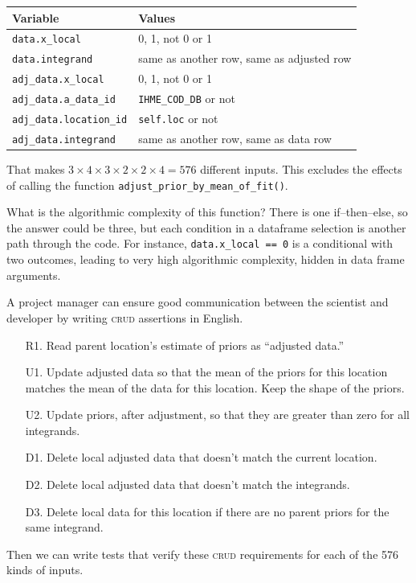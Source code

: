 \documentclass[fleqn,10pt]{olplainarticle}
\begin{document}
\begin{center}
\begin{tabular}{|l|l|}
\hline Variable & Values \\ \hline
\lstinline!data.x_local! & 0, 1, not 0 or 1 \\
\lstinline!data.integrand! & same as another row, same as adjusted row \\
\lstinline!adj_data.x_local! & 0, 1, not 0 or 1 \\
\lstinline!adj_data.a_data_id! & \lstinline!IHME_COD_DB! or not \\
\lstinline!adj_data.location_id! & \lstinline!self.loc! or not \\
\lstinline!adj_data.integrand! & same as another row, same as data row \\ \hline
\end{tabular}
\end{center}

\noindent{}That makes $3\times 4 \times 3\times 2\times 2\times 4=576$ different inputs.
This excludes the effects of calling the function
\lstinline!adjust_prior_by_mean_of_fit()!.

What is the algorithmic complexity of this function? There is one
if--then--else, so the answer could be three, but each condition in a dataframe
selection is another path through the code. For instance,
\lstinline!data.x_local == 0! is a conditional with two outcomes, leading
to very high algorithmic complexity, hidden in data frame arguments.

A project manager can ensure good communication between the scientist and
developer by writing \textsc{crud} assertions in English.
\begin{itemize}
    \item[R1.] Read parent location's estimate of priors as ``adjusted data.''
    \item[U1.] Update adjusted data so that the mean of the priors for this location matches
        the mean of the data for this location. Keep the shape of the priors.
    \item[U2.] Update priors, after adjustment, so that they are greater
        than zero for all integrands.
    \item[D1.] Delete local adjusted data that doesn't match the current location.
    \item[D2.] Delete local adjusted data that doesn't match the integrands.
    \item[D3.] Delete local data for this location if there are no parent
        priors for the same integrand.
\end{itemize}
Then we can write tests that verify these \textsc{crud} requirements for
each of the 576 kinds of inputs.
\end{document}
